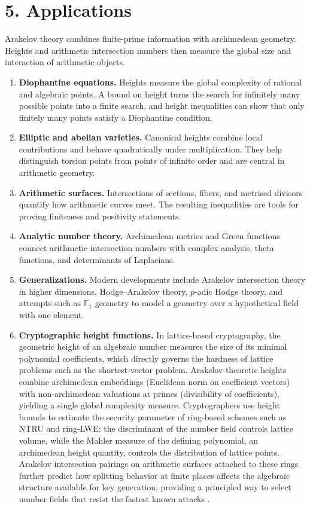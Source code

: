 \section*{5. Applications}
Arakelov theory combines finite-prime information with archimedean geometry. Heights and arithmetic intersection numbers then measure the global size and interaction of arithmetic objects.
\begin{enumerate}[leftmargin=*,itemsep=0.35em]
\item \textbf{Diophantine equations.} Heights measure the global complexity of rational and algebraic points. A bound on height turns the search for infinitely many possible points into a finite search, and height inequalities can show that only finitely many points satisfy a Diophantine condition.
\item \textbf{Elliptic and abelian varieties.} Canonical heights combine local contributions and behave quadratically under multiplication. They help distinguish torsion points from points of infinite order and are central in arithmetic geometry.
\item \textbf{Arithmetic surfaces.} Intersections of sections, fibers, and metrised divisors quantify how arithmetic curves meet. The resulting inequalities are tools for proving finiteness and positivity statements.
\item \textbf{Analytic number theory.} Archimedean metrics and Green functions connect arithmetic intersection numbers with complex analysis, theta functions, and determinants of Laplacians.
\item \textbf{Generalizations.} Modern developments include Arakelov intersection theory in higher dimensions, Hodge--Arakelov theory, $p$-adic Hodge theory, and attempts such as $\mathbb F_1$ geometry to model a geometry over a hypothetical field with one element.
\item \textbf{Cryptographic height functions.} In lattice-based cryptography, the geometric height of an algebraic number measures the size of its minimal polynomial coefficients, which directly governs the hardness of lattice problems such as the shortest-vector problem. Arakelov-theoretic heights combine archimedean embeddings (Euclidean norm on coefficient vectors) with non-archimedean valuations at primes (divisibility of coefficients), yielding a single global complexity measure. Cryptographers use height bounds to estimate the security parameter of ring-based schemes such as NTRU and ring-LWE: the discriminant of the number field controls lattice volume, while the Mahler measure of the defining polynomial, an archimedean height quantity, controls the distribution of lattice points. Arakelov intersection pairings on arithmetic surfaces attached to these rings further predict how splitting behavior at finite places affects the algebraic structure available for key generation, providing a principled way to select number fields that resist the fastest known attacks \cite{arakelov_theory_ref3,arakelov_theory_ref4}.
\end{enumerate}


